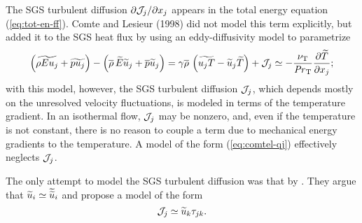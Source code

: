 \documentclass[tcfd]{svjour}
\begin{document}
The SGS turbulent diffusion $\partial{\cal J}_j/\partial x_j$ appears
in the total energy equation (\ref{eq:tot-en-ff}). Comte and Lesieur (1998)
did not model this term explicitly, but added it to
the SGS heat f\/lux by using an eddy-diffusivity model to parametrize
\begin{equation}
 \label{eq:comtel-qj}
 \left( \widetilde{\rho Eu_j} +\widetilde{pu_j} \right) -
 \left(\rhob \widetilde{E}\util_j+\pb\util_j\right)
 = \gamma \rhob \left(\widetilde{u_j T}-\util_j\widetilde{T}\right)
 + {\cal J}_j
 \simeq -\frac{\nu_{\rm T}}{\prt}
 \frac{\partial\widetilde{T}}{\partial x_j};
\end{equation}
with this model, however, the SGS turbulent diffusion ${\cal J}_j$,
which depends mostly on the unresolved velocity f\/luctuations, is
modeled in terms of the temperature gradient. In an isothermal f\/low,
${\cal J}_j$ may be nonzero, and, even if the temperature is
not constant, there is no reason to couple a term due to mechanical
energy gradients to the temperature. A model of the form
(\ref{eq:comtel-qj}) effectively neglects ${\cal J}_j$.

The only attempt to model the SGS turbulent diffusion was that by
\citet{kni98}. They argue that ${\widetilde u_i}\simeq{\widetilde{\widetilde{u}}_i}$ and
propose a model of the form
\begin{equation}
 \label{eq:tdif-knight}
 {\cal J}_j \simeq \utk\tau_{jk}.
\end{equation}
\end{document}
